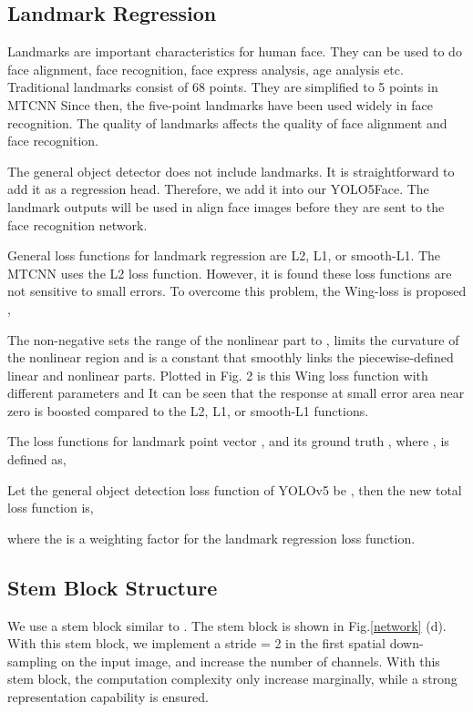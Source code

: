 \documentclass[conference]{IEEEtran}
\begin{document}
\subsection{Landmark Regression}

Landmarks are important characteristics for human face. They can be used to do face alignment, face recognition, face express analysis, age analysis etc. Traditional landmarks consist of 68 points. They are simplified to 5 points in MTCNN \cite{MTCNN} Since then, the five-point landmarks have been used widely in face recognition. The quality of landmarks affects the quality of face alignment and face recognition. 

The general object detector does not include landmarks. It is straightforward to add it as a regression head. Therefore, we add it into our YOLO5Face. The landmark outputs will be used in align face images before they are sent to the face recognition network. 

General loss functions for landmark regression are L2, L1, or smooth-L1. The MTCNN \cite{MTCNN} uses the L2 loss function.  However, it is found these loss functions are not sensitive to small errors. To overcome this problem, the Wing-loss is proposed \cite{wingloss},      


The non-negative  sets the range of the nonlinear part to ,  limits the curvature of the nonlinear region and  is a constant that smoothly links the piecewise-defined linear and nonlinear parts. Plotted in Fig. 2 is this Wing loss function with different parameters and  It can be seen that the response at small error area near zero is boosted compared to the L2, L1, or smooth-L1 functions.   

The loss functions for landmark point vector  , and its ground truth , where , is defined as, 

Let the general object detection loss function of YOLOv5 be , then the new total loss function is, 

where the  is a weighting factor for the landmark regression loss function. 

\subsection{Stem Block Structure}

We use a stem block similar to \cite{Stem}. The stem block is shown in Fig.\ref{network} (d). With this stem block, we implement a stride = 2  in the first spatial down-sampling on the input image, and increase the number of channels. With this stem block, the computation complexity only increase marginally, while a strong representation capability is ensured.  
\end{document}
